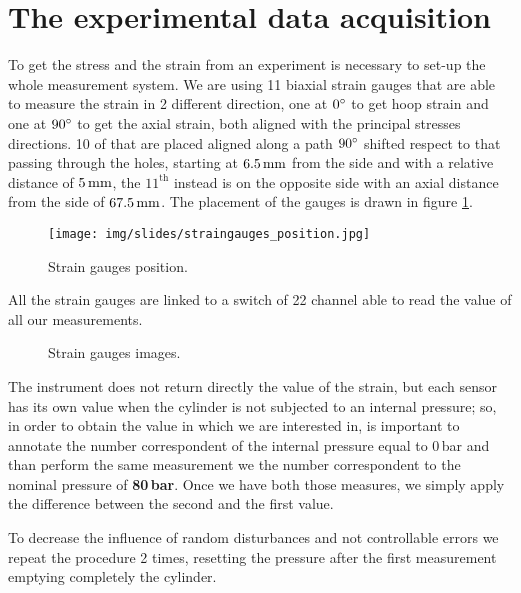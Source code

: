 \documentclass[a4paper,12pt]{article}
\begin{document}
\section{The experimental data acquisition}

To get the stress and the strain from an experiment is necessary to set-up the whole measurement system. 
We are using 11 biaxial strain gauges that are able to measure the strain in 2 different direction, one at $0\degree$ to get hoop strain and one at $90\degree$ to get the axial strain, both aligned with the principal stresses directions.
10 of that are placed aligned along a path $90\degree$ shifted respect to that passing through the holes, starting at $6.5\,\text{mm}$ from the side and with a relative distance of $5\,\text{mm}$, the $11^\text{th}$ instead is on the opposite side with an axial distance from the side of $67.5\,\text{mm}$. 
The placement of the gauges is drawn in figure \ref{fig:straingauges_position}.
\begin{figure}[H]
\centering
\texttt{[image: img/slides/straingauges\_position.jpg]}
\label{fig:straingauges_position}
\caption{Strain gauges position.}
\end{figure}
All the strain gauges are linked to a switch of 22 channel able to read the value of all our measurements.

\begin{figure}[h]
\centering     %
\caption{Strain gauges images.}
\qquad
{}
\label{fig:wheel_geometry}
\end{figure}

The instrument does not return directly the value of the strain, but each sensor has its own value when the cylinder is not subjected to an internal pressure; so, in order to obtain  the value in which we are interested in, is important to annotate the number correspondent of the internal pressure equal to 0\,bar and than perform the same measurement we the number correspondent to the nominal pressure of \textbf{80\,bar}. Once we have both those measures, we simply apply the difference between the second and the first value.

To decrease the influence of random disturbances and not controllable errors we repeat the procedure 2 times, resetting the pressure after the first measurement emptying completely the cylinder.
\end{document}

